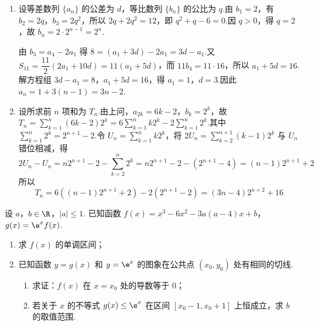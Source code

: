 \begin{solution}
\begin{enumerate}
\item 设等差数列 \(\{a_n\}\) 的公差为 \(d\)，等比数列 \(\{b_n\}\) 的公比为 \(q\).由 \(b_1=2\)，有 \(b_2=2q\)，\(b_3=2q^2\)，所以 \(2q+2q^2=12\)，即 \(q^2+q-6=0\).因 \(q>0\)，得 \(q=2\)，故 \(b_n=2\cdot2^{n-1}=2^n\).

由 \(b_3=a_4-2a_1\) 得 \(8=(a_1+3d)-2a_1=3d-a_1\).又 \(S_{11}=\dfrac{11}{2}(2a_1+10d)=11(a_1+5d)\)，而 \(11b_4=11\cdot16\)，所以 \(a_1+5d=16\).解方程组
\(3d-a_1=8\)，\(a_1+5d=16\)，得 \(a_1=1\)，\(d=3\).因此 \(a_n=1+3(n-1)=3n-2\).

\item 设所求前 \(n\) 项和为 \(T_n\).由上问，\(a_{2k}=6k-2\)，\(b_k=2^k\)，故
\(T_n=\sum_{k=1}^n(6k-2)2^k=6\sum_{k=1}^n k2^k-2\sum_{k=1}^n2^k\).其中 \(\sum_{k=1}^n2^k=2^{n+1}-2\).令 \(U_n=\sum_{k=1}^n k2^k\)，将 \(2U_n=\sum_{k=2}^{n+1}(k-1)2^k\) 与 \(U_n\) 错位相减，得
\[
2U_n-U_n=n2^{n+1}-2-\sum_{k=2}^{n}2^k=n2^{n+1}-2-\left(2^{n+1}-4\right)=(n-1)2^{n+1}+2
\]
所以
\[
T_n=6\left((n-1)2^{n+1}+2\right)-2\left(2^{n+1}-2\right)=(3n-4)2^{n+2}+16
\]
\end{enumerate}
\end{solution}

\begin{problem}
设 \(a\)，\(b\in\R\)，\(|a|\le 1\). 已知函数 \(f(x)=x^3-6x^2-3a(a-4)x+b\)，\(g(x)=\e^x f(x)\).

\begin{enumerate}
\item 求 \(f(x)\) 的单调区间；
\item 已知函数 \(y=g(x)\) 和 \(y=\e^x\) 的图象在公共点 \((x_0,y_0)\) 处有相同的切线.
\begin{enumerate}
\item 求证：\(f(x)\) 在 \(x=x_0\) 处的导数等于 \(0\)；
\item 若关于 \(x\) 的不等式 \(g(x)\le \e^x\) 在区间 \([x_0-1,x_0+1]\) 上恒成立，求 \(b\) 的取值范围.
\end{enumerate}
\end{enumerate}
\end{problem}

